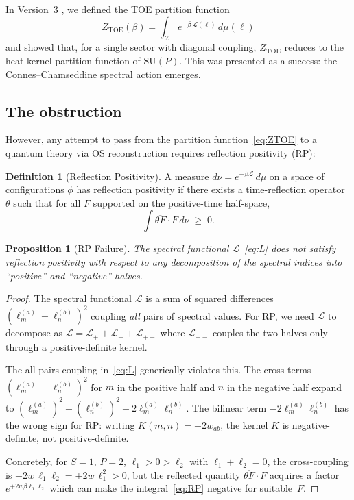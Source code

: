 \documentclass[12pt]{article}
\newtheorem{proposition}[theorem]{Proposition}
\theoremstyle{definition}
\newtheorem{definition}[theorem]{Definition}
\theoremstyle{remark}
\newcommand{\SU}{\mathrm{SU}}
\newcommand{\TOE}{\mathrm{TOE}}
\begin{document}
In Version~3 \cite{Olbryk2026v3}, we defined the TOE partition function
\begin{equation}\label{eq:ZTOE}
  Z_\TOE(\beta)
  = \int_{\mathcal{X}} e^{-\beta\,\mathcal{L}(\ell)}\,d\mu(\ell)
\end{equation}
and showed that, for a single sector with diagonal coupling,
$Z_\TOE$ reduces to the heat-kernel partition function of $\SU(P)$.
This was presented as a success: the Connes--Chamseddine spectral
action emerges.

\subsection{The obstruction}

However, any attempt to pass from the partition function~\eqref{eq:ZTOE}
to a quantum theory via OS reconstruction requires reflection
positivity (RP):

\begin{definition}[Reflection Positivity]
A measure $d\nu = e^{-\beta\mathcal{L}}\,d\mu$ on a space of
configurations $\phi$ has reflection positivity if there exists a
time-reflection operator $\theta$ such that for all $F$ supported on
the positive-time half-space,
\begin{equation}\label{eq:RP}
  \int \overline{\theta F}\cdot F\,d\nu \;\geq\; 0.
\end{equation}
\end{definition}

\begin{proposition}[RP Failure]\label{prop:RP_fail}
The spectral functional $\mathcal{L}$~\eqref{eq:L} does not satisfy
reflection positivity with respect to any decomposition of the spectral
indices into ``positive'' and ``negative'' halves.
\end{proposition}

\begin{proof}
The spectral functional $\mathcal{L}$ is a sum of squared differences
$(\ell_m^{(a)} - \ell_n^{(b)})^2$ coupling \emph{all} pairs of spectral
values.  For RP, we need $\mathcal{L}$ to decompose as
$\mathcal{L} = \mathcal{L}_+ + \mathcal{L}_- + \mathcal{L}_{+-}$
where $\mathcal{L}_{+-}$ couples the two halves only through a
positive-definite kernel.

The all-pairs coupling in~\eqref{eq:L} generically violates this.
The cross-terms $(\ell_m^{(a)} - \ell_n^{(b)})^2$ for $m$ in the
positive half and $n$ in the negative half expand to
$(\ell_m^{(a)})^2 + (\ell_n^{(b)})^2 - 2\ell_m^{(a)}\ell_n^{(b)}$.
The bilinear term $-2\ell_m^{(a)}\ell_n^{(b)}$ has the wrong sign
for RP: writing $K(m,n) = -2w_{ab}$, the kernel $K$ is
negative-definite, not positive-definite.

Concretely, for $S=1$, $P=2$, $\ell_1 > 0 > \ell_2$ with
$\ell_1 + \ell_2 = 0$, the cross-coupling is
$-2w\,\ell_1\ell_2 = +2w\,\ell_1^2 > 0$, but the reflected quantity
$\overline{\theta F}\cdot F$ acquires a factor $e^{+2w\beta\ell_1\ell_2}$
which can make the integral~\eqref{eq:RP} negative for suitable~$F$.
\end{proof}
\end{document}

